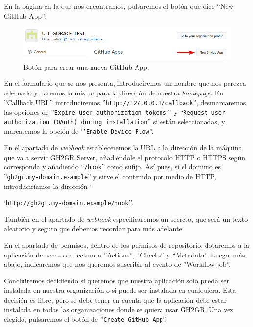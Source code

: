 En la página en la que nos encontramos, pulsaremos el botón que dice ``New GitHub App''.

\begin{figure}[H]
    \centering
    \includegraphics[width=0.5\linewidth]{images/new-app-btn.png}
    \caption{Botón para crear una nueva GitHub App.}
\end{figure}

En el formulario que se nos presenta, introduciremos un nombre que nos parezca adecuado y haremos lo mismo para la dirección de nuestra \textit{homepage}. En ''Callback URL'' introduciremos ''{\tt http://127.0.0.1/callback}'', desmarcaremos las opciones de ''{\tt Expire user authorization tokens'}' y ``{\tt Request user authorization (OAuth) during installation}'' si están seleccionadas, y marcaremos la opción de '{\tt 'Enable Device Flow}''.

En el apartado de \textit{webhook} estableceremos la URL a la dirección de la máquina que va a servir GH2GR Server, añadiéndole el protocolo \acrshort{HTTP} o \acrshort{HTTPS} según corresponda y añadiendo ``{\tt /hook}'' como sufijo. Así pues, si el dominio es ''{\tt gh2gr.my-domain.example}'' y sirve el contenido por medio de \acrshort{HTTP}, introduciríamos la dirección `

`{\tt http://gh2gr.my-domain.example/hook}''. 

También en el apartado de \textit{webhook} especificaremos un secreto, que será un texto aleatorio y seguro que debemos recordar para más adelante.

En el apartado de permisos, dentro de los permisos de repositorio, dotaremos a la aplicación de acceso de lectura a ''Actions'', ''Checks'' y ``Metadata''. Luego, más abajo, indicaremos que nos queremos suscribir al evento de ''Workflow job''.

Concluiremos decidiendo si queremos que nuestra aplicación solo pueda ser instalada en nuestra organización o si puede ser instalada en cualquiera. Esta decisión es libre, pero se debe tener en cuenta que la aplicación debe estar instalada en todas las organizaciones donde se quiera usar GH2GR. Una vez elegido, pulsaremos el botón de ''{\tt Create GitHub App}''.

